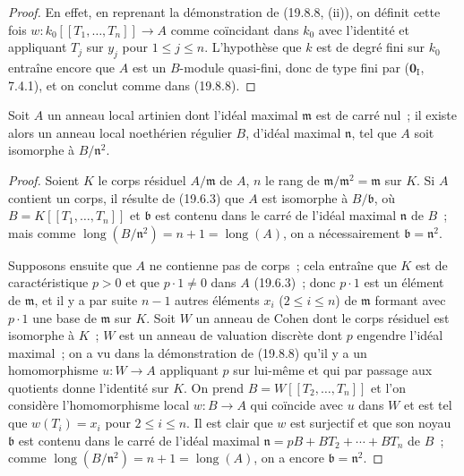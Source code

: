 \begin{proof}
En effet, en reprenant la démonstration de (19.8.8, (ii)), on définit cette fois
$w:k_0[[T_1,\ldots,T_n]]\to A$ comme coïncidant dans $k_0$ avec l'identité et
appliquant $T_j$ sur $y_j$ pour $1\leq j\leq n$. L'hypothèse que $k$ est de
degré fini sur $k_0$ entraîne encore que $A$ est un $B$-module quasi-fini, donc
de type fini par ($\mathbf 0_{\mathrm I}$, 7.4.1), et on conclut comme dans
(19.8.8).
\end{proof}

\begin{corollary}[19.8.10]
\label{0.19.8.10-fr}
Soit $A$ un anneau local artinien dont l'idéal maximal $\mathfrak m$ est de
carré nul~; il existe alors un anneau local noethérien régulier $B$, d'idéal
maximal $\mathfrak n$, tel que $A$ soit isomorphe à $B/\mathfrak n^2$.
\end{corollary}

\begin{proof}
Soient $K$ le corps résiduel $A/\mathfrak m$ de $A$, $n$ le rang de
$\mathfrak m/\mathfrak m^2=\mathfrak m$ sur $K$. Si $A$ contient un corps, il
résulte de (19.6.3) que $A$ est isomorphe à $B/\mathfrak b$, où
$B=K[[T_1,\ldots,T_n]]$ et $\mathfrak b$ est contenu dans le carré de l'idéal
maximal $\mathfrak n$ de $B$~; mais comme
$\operatorname{long}(B/\mathfrak n^2)=n+1=\operatorname{long}(A)$, on a
nécessairement $\mathfrak b=\mathfrak n^2$.

Supposons ensuite que $A$ ne contienne pas de corps~; cela entraîne que $K$ est
de caractéristique $p>0$ et que $p\cdot1\neq0$ dans $A$ (19.6.3)~; donc
$p\cdot1$ est un élément de $\mathfrak m$, et il y a par suite $n-1$ autres
éléments $x_i$ ($2\leq i\leq n$) de $\mathfrak m$ formant avec $p\cdot1$ une
base de $\mathfrak m$ sur $K$. Soit $W$ un anneau de Cohen dont le corps
résiduel est isomorphe à $K$~; $W$ est un anneau de valuation discrète dont $p$
engendre l'idéal maximal~; on a vu dans la démonstration de (19.8.8) qu'il y a
un homomorphisme $u:W\to A$ appliquant $p$ sur lui-même et qui par passage aux
quotients donne l'identité sur $K$. On prend $B=W[[T_2,\ldots,T_n]]$ et l'on
considère l'homomorphisme local $w:B\to A$ qui coïncide avec $u$ dans $W$ et
est tel que $w(T_i)=x_i$ pour $2\leq i\leq n$. Il est clair que $w$ est
surjectif et que son noyau $\mathfrak b$ est contenu dans le carré de l'idéal
maximal $\mathfrak n=pB+BT_2+\cdots+BT_n$ de $B$~; comme
$\operatorname{long}(B/\mathfrak n^2)=n+1=\operatorname{long}(A)$, on a encore
$\mathfrak b=\mathfrak n^2$.
\end{proof}

